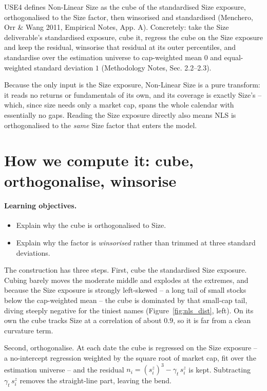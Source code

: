 \documentclass[11pt]{article}
\theoremstyle{definition}
\theoremstyle{plain}
\theoremstyle{remark}
\begin{document}
USE4 defines Non-Linear Size as the cube of the standardised Size exposure, orthogonalised to the Size factor, then winsorised and standardised (Menchero, Orr \& Wang 2011, Empirical Notes, App. A). Concretely: take the Size deliverable's standardised exposure, cube it, regress the cube on the Size exposure and keep the residual, winsorise that residual at its outer percentiles, and standardise over the estimation universe to cap-weighted mean $0$ and equal-weighted standard deviation $1$ (Methodology Notes, Sec. 2.2--2.3).

Because the only input is the Size exposure, Non-Linear Size is a pure transform: it reads no returns or fundamentals of its own, and its coverage is exactly Size's -- which, since size needs only a market cap, spans the whole calendar with essentially no gaps. Reading the Size exposure directly also means NLS is orthogonalised to the \emph{same} Size factor that enters the model.

\section{How we compute it: cube, orthogonalise, winsorise}\label{sec:compute}

\paragraph{Learning objectives.}
\begin{itemize}[leftmargin=1.4em,topsep=2pt]
  \item Explain why the cube is orthogonalised to Size.
  \item Explain why the factor is \emph{winsorised} rather than trimmed at three standard deviations.
\end{itemize}

The construction has three steps. First, cube the standardised Size exposure. Cubing barely moves the moderate middle and explodes at the extremes, and because the Size exposure is strongly left-skewed -- a long tail of small stocks below the cap-weighted mean -- the cube is dominated by that small-cap tail, diving steeply negative for the tiniest names (Figure~\ref{fig:nls_dist}, left). On its own the cube tracks Size at a correlation of about $0.9$, so it is far from a clean curvature term.

Second, orthogonalise. At each date the cube is regressed on the Size exposure -- a no-intercept regression weighted by the square root of market cap, fit over the estimation universe -- and the residual $n_i = (s^{z}_i)^{3} - \gamma_t\,s^{z}_i$ is kept. Subtracting $\gamma_t\,s^{z}_i$ removes the straight-line part, leaving the bend.
\end{document}
